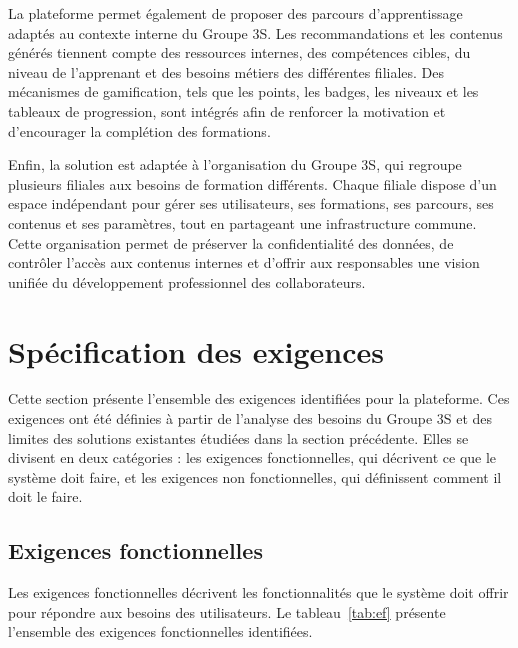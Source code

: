La plateforme permet également de proposer des parcours d'apprentissage adaptés au contexte interne 
du Groupe 3S. Les recommandations et les contenus générés tiennent compte des ressources internes, 
des compétences cibles, du niveau de l'apprenant et des besoins métiers des différentes filiales. 
Des mécanismes de gamification, tels que les points, les badges, les niveaux et les tableaux de 
progression, sont intégrés afin de renforcer la motivation et d'encourager la complétion des 
formations.

Enfin, la solution est adaptée à l'organisation du Groupe 3S, qui regroupe plusieurs filiales aux 
besoins de formation différents. Chaque filiale dispose d'un espace indépendant pour gérer ses 
utilisateurs, ses formations, ses parcours, ses contenus et ses paramètres, tout en partageant une 
infrastructure commune. Cette organisation permet de préserver la confidentialité des données, de 
contrôler l'accès aux contenus internes et d'offrir aux responsables une vision unifiée du 
développement professionnel des collaborateurs.


\section{Spécification des exigences}

Cette section présente l'ensemble des exigences identifiées pour la plateforme. 
Ces exigences ont été définies à partir de l'analyse des besoins du Groupe 3S 
et des limites des solutions existantes étudiées dans la section précédente. 
Elles se divisent en deux catégories : les exigences 
fonctionnelles, qui décrivent ce que le système doit faire, et les exigences 
non fonctionnelles, qui définissent comment il doit le faire.


\subsection{Exigences fonctionnelles}

Les exigences fonctionnelles décrivent les fonctionnalités que le système doit 
offrir pour répondre aux besoins des utilisateurs. Le tableau~\ref{tab:ef} 
présente l'ensemble des exigences fonctionnelles identifiées.

